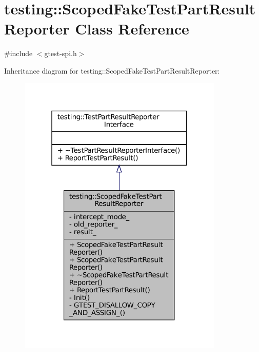 \hypertarget{classtesting_1_1ScopedFakeTestPartResultReporter}{}\section{testing\+:\+:Scoped\+Fake\+Test\+Part\+Result\+Reporter Class Reference}
\label{classtesting_1_1ScopedFakeTestPartResultReporter}


{\ttfamily \#include $<$gtest-\/spi.\+h$>$}



Inheritance diagram for testing\+:\+:Scoped\+Fake\+Test\+Part\+Result\+Reporter\+:
\nopagebreak
\begin{figure}[H]
\begin{center}
\leavevmode
\includegraphics[width=277pt]{classtesting_1_1ScopedFakeTestPartResultReporter__inherit__graph}
\end{center}
\end{figure}


